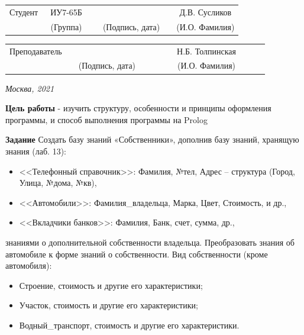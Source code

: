 \documentclass[12pt, a4paper]{extarticle}
\begin{document}
\noindent
{}
\\

\noindent
{}
\\

\vspace{1.5cm}
\noindent
\begin{tabular}{l c c c c c}
	Студент      & ~ИУ7-65Б~               & \hspace{2.5cm} & \hspace{2cm}                 & &  Д.В. Сусликов \\\cline{2-2}\cline{4-4} \cline{6-6} 
	\hspace{3cm} & {\footnotesize(Группа)} &                & {\footnotesize(Подпись, дата)} & & {\footnotesize(И.О. Фамилия)}
\end{tabular}

\noindent
\begin{tabular}{l c c c c}
	Преподаватель & \hspace{5cm}   & \hspace{2cm}                 & & ~~~~~~Н.Б. Толпинская~~~~~~\\\cline{3-3} \cline{5-5} 
	\hspace{3cm}  &                & {\footnotesize(Подпись, дата)} & & {\footnotesize(И.О. Фамилия)}
\end{tabular}

\vspace{0.6cm}
\begin{center}	
	\vfill
	\large \textit {Москва, 2021}
\end{center}

\thispagestyle {empty}
\pagebreak

\clearpage


\textbf{Цель работы} - изучить структуру, особенности и принципы оформления программы, и способ выполнения программы на Prolog

\textbf{Задание}
	Создать базу знаний «Собственники», дополнив базу знаний, хранящую знания (лаб. 13):
	\begin{itemize}
		\item <<Телефонный справочник>>: Фамилия, №тел, Адрес – структура (Город, Улица, №дома, №кв),
		\item <<Автомобили>>: Фамилия\_владельца, Марка, Цвет, Стоимость, и др.,
		\item <<Вкладчики банков>>: Фамилия, Банк, счет, сумма, др.,
	\end{itemize}
	знаниями о дополнительной собственности владельца. Преобразовать знания об автомобиле к форме знаний о собственности.
	Вид собственности (кроме автомобиля):
	\begin{itemize}
		\item Строение, стоимость и другие его характеристики;
		\item Участок, стоимость и другие его характеристики;
		\item Водный\_транспорт, стоимость и другие его характеристики.
	\end{itemize}
	
\end{document}
